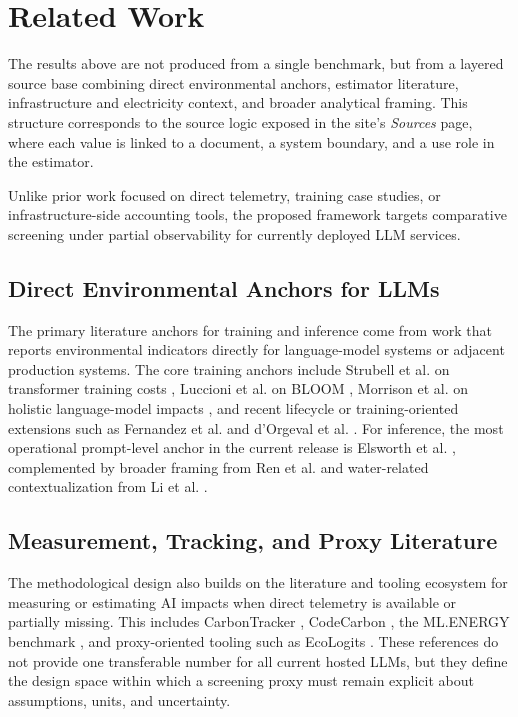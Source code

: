 \documentclass[runningheads]{llncs}
\begin{document}
\section{Related Work}
The results above are not produced from a single benchmark, but from a layered source base combining direct environmental anchors, estimator literature, infrastructure and electricity context, and broader analytical framing. This structure corresponds to the source logic exposed in the site's \emph{Sources} page, where each value is linked to a document, a system boundary, and a use role in the estimator.

\par Unlike prior work focused on direct telemetry, training case studies, or infrastructure-side accounting tools, the proposed framework targets comparative screening under partial observability for currently deployed LLM services.

\subsection{Direct Environmental Anchors for LLMs}
The primary literature anchors for training and inference come from work that reports environmental indicators directly for language-model systems or adjacent production systems. The core training anchors include Strubell et al. on transformer training costs \cite{strubell2019}, Luccioni et al. on BLOOM \cite{luccioni2023}, Morrison et al. on holistic language-model impacts \cite{morrison2025}, and recent lifecycle or training-oriented extensions such as Fernandez et al. \cite{fernandez2025lca} and d'Orgeval et al. \cite{dorgeval2026}. For inference, the most operational prompt-level anchor in the current release is Elsworth et al. \cite{elsworth2025}, complemented by broader framing from Ren et al. \cite{ren2024} and water-related contextualization from Li et al. \cite{li2025water}.

\subsection{Measurement, Tracking, and Proxy Literature}
The methodological design also builds on the literature and tooling ecosystem for measuring or estimating AI impacts when direct telemetry is available or partially missing. This includes CarbonTracker \cite{anthony2020carbontracker}, CodeCarbon \cite{codecarbon2026}, the ML.ENERGY benchmark \cite{mlenergy2025}, and proxy-oriented tooling such as EcoLogits \cite{ecologits2026}. These references do not provide one transferable number for all current hosted LLMs, but they define the design space within which a screening proxy must remain explicit about assumptions, units, and uncertainty.
\end{document}

